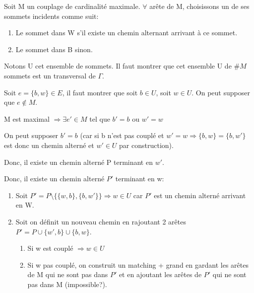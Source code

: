 \begin{demo}
Soit M un couplage de cardinalité maximale. $\forall$ arête de M, choisissons un de ses sommets incidents comme suit:
\begin{enumerate}
\item Le sommet dans W s'il existe un chemin alternant arrivant à ce sommet.
\item Le sommet dans B sinon.
\end{enumerate}
Notons U cet ensemble de sommets. Il faut montrer que cet ensemble U de $\#M$ sommets est un transversal de $\Gamma$.

\hspace{-0.55cm}Soit $e=\{b,w\} \in E$, il faut montrer que soit $b\in U$, soit $w\in U$. On peut supposer que $e \notin M$.

\hspace{-0.55cm}M est maximal $\Rightarrow \exists {e}' \in M$ tel que ${b}'=b$ ou ${w}' = w$

\hspace{-0.55cm}On peut supposer ${b}' = b$ (car si b n'est pas couplé et ${w}' = w \Rightarrow \{b,w\} = \{b,{w}'\}$ est donc un chemin alterné et ${w}' \in U$ par construction).  

\hspace{-0.55cm}Donc, il existe un chemin alterné P terminant en ${w}'$.

\hspace{-0.55cm}Donc, il existe un chemin alterné ${P}'$ terminant en w:

	\begin{enumerate}
	\item Soit ${P}' = P \setminus \{ \{ w,b \}, \{ b, {w}' \} \} \Rightarrow w \in U$ car ${P}'$ est un chemin alterné arrivant en W.
	\item Soit on définit un nouveau chemin en rajoutant 2 arêtes ${P}'= P \cup \{ {w}',b\} \cup \{ b, w \}$.

		\begin{enumerate}
		\item Si w est couplé $\Rightarrow w \in U$
		\item Si w pas couplé, on construit un matching + grand en gardant les arêtes de M qui ne sont pas dans ${P}'$ et en ajoutant les arêtes de ${P}'$ qui ne sont pas dans M (impossible?).
		\end{enumerate}
	\end{enumerate}
\end{demo}

\newpage

